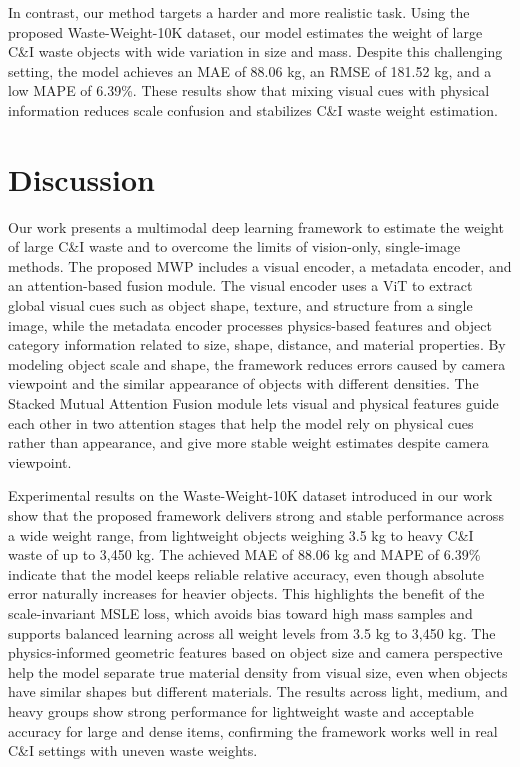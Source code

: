 \documentclass[journal,twoside,web]{ieeecolor}
\begin{document}
In contrast, our method targets a harder and more realistic task. Using the proposed Waste-Weight-10K dataset, our model estimates the weight of large C\&I waste objects with wide variation in size and mass. Despite this challenging setting, the model achieves an MAE of 88.06 kg, an RMSE of 181.52 kg, and a low MAPE of 6.39\%. These results show that mixing visual cues with physical information reduces scale confusion and stabilizes C\&I waste weight estimation.

\section{Discussion}
\label{sec6}
Our work presents a multimodal deep learning framework to estimate the weight of large C\&I waste and to overcome the limits of vision-only, single-image methods. The proposed MWP includes a visual encoder, a metadata encoder, and an attention-based fusion module. The visual encoder uses a ViT to extract global visual cues such as object shape, texture, and structure from a single image, while the metadata encoder processes physics-based features and object category information related to size, shape, distance, and material properties. By modeling object scale and shape, the framework reduces errors caused by camera viewpoint and the similar appearance of objects with different densities. The Stacked Mutual Attention Fusion module lets visual and physical features guide each other in two attention stages that help the model rely on physical cues rather than appearance, and give more stable weight estimates despite camera viewpoint.

Experimental results on the Waste-Weight-10K dataset introduced in our work show that the proposed framework delivers strong and stable performance across a wide weight range, from lightweight objects weighing 3.5 kg to heavy C\&I waste of up to 3,450 kg. The achieved MAE of 88.06 kg and MAPE of 6.39\% indicate that the model keeps reliable relative accuracy, even though absolute error naturally increases for heavier objects. This highlights the benefit of the scale-invariant MSLE loss, which avoids bias toward high mass samples and supports balanced learning across all weight levels from 3.5 kg to 3,450 kg. The physics-informed geometric features based on object size and camera perspective help the model separate true material density from visual size, even when objects have similar shapes but different materials. The results across light, medium, and heavy groups show strong performance for lightweight waste and acceptable accuracy for large and dense items, confirming the framework works well in real C\&I settings with uneven waste weights.
\end{document}
